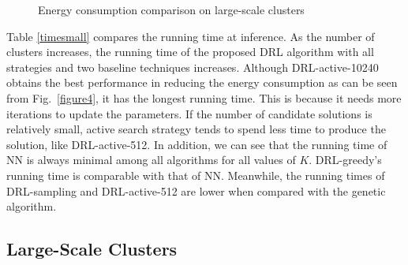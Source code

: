 \documentclass[journal]{IEEEtran}
\begin{document}
\begin{figure}[!t]
  \centering
    \hspace{0.1in}\hspace{0in}
	  \hspace{0in}
     \caption{Energy consumption comparison on large-scale clusters}
     \label{figure5}
\end{figure}


Table \ref{timesmall} compares the running time at inference. As the number of clusters increases, the running time of the proposed DRL algorithm with all strategies and two baseline techniques increases. Although DRL-active-10240 obtains the best performance in reducing the energy consumption as can be seen from Fig.~\ref{figure4}, it has the longest running time. This is because it needs more iterations to update the parameters. If the number of candidate solutions is relatively small, active search strategy tends to spend less time to produce the solution, like DRL-active-512. In addition, we can see that the running time of NN is always minimal among all algorithms for all values of $K$. DRL-greedy's running time is comparable with that of NN. Meanwhile, the running times of DRL-sampling and DRL-active-512 are lower when compared with the genetic algorithm.

\subsection{Large-Scale Clusters}
\end{document}
